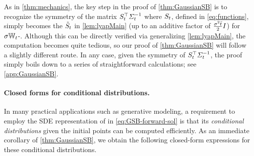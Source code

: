 As in \cref{thm:mechanics}, the key step in the proof of \cref{thm:GaussianSB} is to recognize the symmetry of the matrix $S_{t}^\top \Sigma^{-1}_{ t }$ where $S_{t}$, defined in \eqref{eq:functions}, simply becomes the $\tilde{S}_{t}$ in \cref{lem:lyapMain} (up to an additive factor of $\frac{\sigma^2\bar{t}}{2}I$) for $\sigma\mathbb{W}_{t}$-. Although this can be directly verified via generalizing \cref{lem:lyapMain}, the computation becomes quite tedious, so our proof of \cref{thm:GaussianSB} will follow a slightly different route. In any case, given the symmetry of $S_{t}^\top \Sigma^{-1}_{ t }$, the proof simply boils down to a series of straightforward calculations; see \cref{app:GaussianSB}.


\paragraph{Closed forms for conditional distributions.}
In many practical applications such as generative modeling, a requirement to employ the \acrshort{SDE} representation of  in \eqref{eq:GSB-forward-sol} is that its \emph{conditional distributions} given the initial points can be computed efficiently. As an immediate corollary of \cref{thm:GaussianSB}, we obtain the following closed-form expressions for these conditional distributions. %
